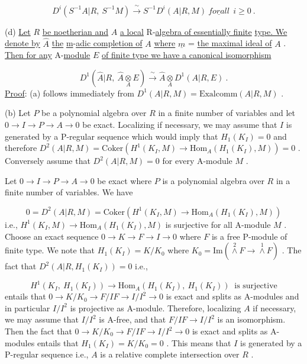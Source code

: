 \begin{equation*}
D^i(S^{-1}A|R, \ S^{-1}M) \xrightarrow{\ \sim\ } S^{-1}D^i(A|R, M)  \ \underline{for all} \ \ i \geq 0  \ .
\end{equation*}


(d)  \underline{Let}  $R$  \underline{be noetherian and}  $A$  \underline{a local} R-\underline{algebra of essentially finite} \underline{type. We denote by}  $\hat{A}$  \underline{the} \underline{m}-\underline{adic completion of}  $A$  \underline{where}  $\underline{m}$ = \underline{the maximal ideal of} $A$  .  \underline{Then for any} A-\underline{module}  $E$  \underline{of finite type we have a canonical isomorphism}

\begin{equation*}
D^1(\hat{A}|R, \ \hat{A} \underset{A}{\otimes} E) \xrightarrow{\ \sim\ } \hat{A} \underset{A}{\otimes} D^1(A|R, E)  \ .
\end{equation*}
\underline{Proof}:  (a)  follows immediately from  $D^1(A|R, M) = \mathrm{Exalcomm}(A|R, M)$ .

(b)  Let  $P$  be a polynomial algebra over  $R$  in a finite number of variables and let  $0 \to I \to P \to A \to 0$  be exact. Localizing if necessary, we may assume that  $I$  is generated by a P-regular sequence which would imply that  $H_1(K_I) = 0$ and therefore  $D^2(A|R, M) = \mathrm{Coker}(H^1(K_I, M) \to \mathrm{Hom}_A(H_1(K_I), M)) = 0$  . Conversely assume that  $D^2(A|R, M) = 0$  for every A-module  $M$  .

Let  $0 \to I \to P \to A \to 0$  be exact where  $P$  is a polynomial algebra over $R$  in a finite number of variables. We have

\begin{equation*}
0 = D^2(A|R, M) = \mathrm{Coker}(H^1(K_I, M) \to \mathrm{Hom}_A(H_1(K_I), M))
\end{equation*}
i.e.,  $H^1(K_I, M) \to \mathrm{Hom}_A(H_1(K_I), M)$  is surjective for all A-module  $M$  . Choose an exact sequence  $0 \to K \to F \to I \to 0$  where  $F$  is a free P-module of finite type. We note that  $H_1(K_I) = K/K_0$  where  $K_0 = \mathrm{Im}(\overset{2}{\wedge} F \to \overset{1}{\wedge} F)$  . The fact that $D^2(A|R, H_1(K_I)) = 0$  i.e.,

\begin{equation*}
H^1(K_I, \ H_1(K_I)) \to \mathrm{Hom}_A(H_1(K_I), \ H_1(K_I))  \ \text{ is surjective}
\end{equation*}
entails that  $0 \to K/K_0 \to F/IF \to I/I^2 \to 0$  is exact and splits as A-modules and in particular  $I/I^2$  is projective as A-module. Therefore, localizing  $A$  if necessary, we may assume that  $I/I^2$  is  A-free, and that  $F/IF \to I/I^2$  is an isomorphism. Then the fact that  $0 \to K/K_0 \to F/IF \to I/I^2 \to 0$  is exact and splits as A-modules entails that  $H_1(K_I) = K/K_0 = 0$  . This means that  $I$  is generated by a P-regular sequence i.e.,  $A$  is a relative complete intersection over  $R$  .

